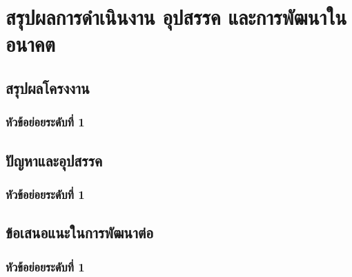 \chapter{สรุปผลการดำเนินงาน อุปสรรค และการพัฒนาในอนาคต}
\label{chapter5}

\section{สรุปผลโครงงาน}

\subsection{หัวข้อย่อยระดับที่ 1}

\section{ปัญหาและอุปสรรค}

\subsection{หัวข้อย่อยระดับที่ 1}

\section{ข้อเสนอแนะในการพัฒนาต่อ}

\subsection{หัวข้อย่อยระดับที่ 1}
